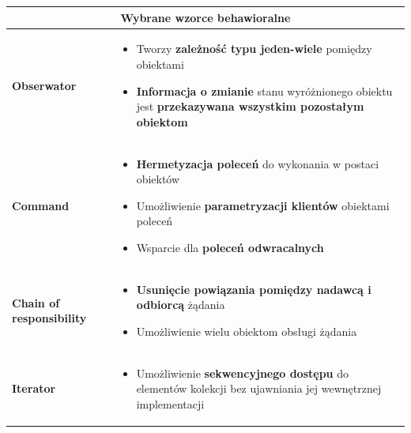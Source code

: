 \documentclass[a4paper]{article}
\begin{document}
    \begin{table}[H]
        \begin{center}
            \begin{tabular}{  p{3cm} p{12cm}  }
                \toprule
                \multicolumn{2}{c}{Wybrane wzorce behawioralne}\\
                \toprule

                \textbf{Obserwator}
                &
                \begin{itemize}
                    \item Tworzy \textbf{zależność typu jeden-wiele} pomiędzy obiektami
                    \item \textbf{Informacja o zmianie} stanu wyróżnionego obiektu jest \textbf{przekazywana wszystkim pozostałym obiektom}
                \end{itemize}
                \\

                \cmidrule(r){1-1}\cmidrule(l){2-2}
                \textbf{Command}
                &
                \begin{itemize}
                    \item \textbf{Hermetyzacja poleceń} do wykonania w postaci obiektów
                    \item Umożliwienie \textbf{parametryzacji klientów} obiektami poleceń
                    \item Wsparcie dla \textbf{poleceń odwracalnych}
                \end{itemize}
                \\

                \cmidrule(r){1-1}\cmidrule(l){2-2}

                \textbf{Chain of responsibility}
                &
                \begin{itemize}
                    \item \textbf{Usunięcie powiązania pomiędzy nadawcą i odbiorcą} żądania
                    \item Umożliwienie wielu obiektom obsługi żądania
                \end{itemize}
                \\

                \cmidrule(r){1-1}\cmidrule(l){2-2}

                \textbf{Iterator}
                &
                \begin{itemize}
                    \item Umożliwienie \textbf{sekwencyjnego dostępu} do elementów kolekcji bez ujawniania jej wewnętrznej implementacji
                \end{itemize}
                \\
                \bottomrule
            \end{tabular}
        \end{center}
    \end{table}
\end{document}
